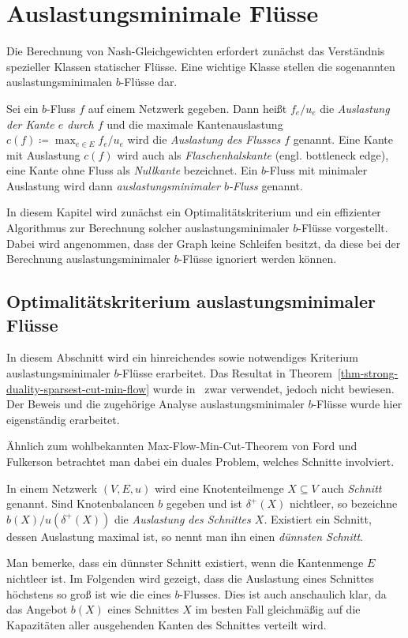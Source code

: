\chapter{Auslastungsminimale Flüsse}\label{chapter-min-con-flows}

Die Berechnung von Nash-Gleichgewichten erfordert zunächst das Verständnis spezieller Klassen statischer Flüsse.
Eine wichtige Klasse stellen die sogenannten auslastungsminimalen $b$-Flüsse dar.

\begin{definition}
	Sei ein $b$-Fluss $f$ auf einem Netzwerk gegeben.
	Dann heißt $f_e/u_e$ die \emph{Auslastung der Kante $e$ durch $f$} und die maximale Kantenauslastung $c(f)\coloneq \max_{e\in E} f_e/u_e$ wird die \emph{Auslastung des Flusses $f$} genannt.
	Eine Kante mit Auslastung $c(f)$ wird auch als \emph{Flaschenhalskante} (engl. bottleneck edge), eine Kante ohne Fluss als \emph{Nullkante} bezeichnet.
	Ein $b$-Fluss mit minimaler Auslastung wird dann \emph{auslastungsminimaler $b$-Fluss} genannt.
\end{definition}

In diesem Kapitel wird zunächst ein Optimalitätskriterium und ein effizienter Algorithmus zur Berechnung solcher auslastungsminimaler $b$-Flüsse vorgestellt.
Dabei wird angenommen, dass der Graph keine Schleifen besitzt, da diese bei der Berechnung auslastungsminimaler $b$-Flüsse ignoriert werden können.

\section{Optimalitätskriterium auslastungsminimaler Flüsse}

In diesem Abschnitt wird ein hinreichendes sowie notwendiges Kriterium auslastungsminimaler $b$-Flüsse erarbeitet.
Das Resultat in Theorem~\ref{thm-strong-duality-sparsest-cut-min-flow} wurde in~\cite[Theorem 6.11]{Koch2012} zwar verwendet, jedoch nicht bewiesen.
Der Beweis und die zugehörige Analyse auslastungsminimaler $b$-Flüsse wurde hier eigenständig erarbeitet.

Ähnlich zum wohlbekannten Max-Flow-Min-Cut-Theorem von Ford und Fulkerson betrachtet man dabei ein duales Problem, welches Schnitte involviert.

\begin{definition}
	In einem Netzwerk $(V, E, u)$ wird eine Knotenteilmenge $X\subseteq V$ auch \emph{Schnitt} genannt.
	Sind Knotenbalancen $b$ gegeben und ist $\delta^+(X)$ nichtleer, so bezeichne $b(X) / u(\delta^+(X))$ die \emph{Auslastung des Schnittes $X$}.
	Existiert ein Schnitt, dessen Auslastung maximal ist, so nennt man ihn einen \emph{dünnsten Schnitt}.
\end{definition}
Man bemerke, dass ein dünnster Schnitt existiert, wenn die Kantenmenge $E$ nichtleer ist.
Im Folgenden wird gezeigt, dass die Auslastung eines Schnittes höchstens so groß ist wie die eines $b$-Flusses.
Dies ist auch anschaulich klar, da das Angebot $b(X)$ eines Schnittes $X$ im besten Fall gleichmäßig auf die Kapazitäten aller ausgehenden Kanten des Schnittes verteilt wird.

